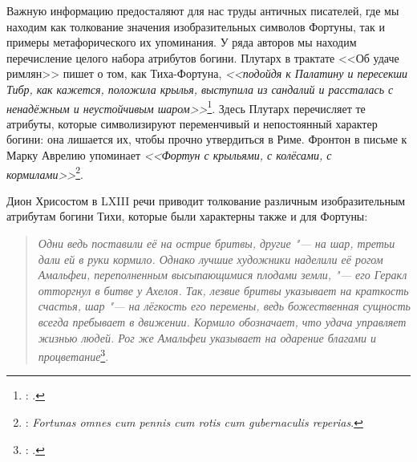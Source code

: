 


Важную информацию предосталяют для нас труды античных писателей, где мы находим как толкование значения изобразительных символов Фортуны, так и примеры метафорического их упоминания.
У ряда авторов мы находим перечисление целого набора атрибутов богини. Плутарх в трактате <<Об удаче римлян>> пишет о том, как Тиха-Фортуна, \textit{<<подойдя к Палатину и пересекши Тибр, как кажется, положила крылья, выступила из сандалий и рассталась с ненадёжным и неустойчивым шаром>>}\footnote{: .}. Здесь Плутарх перечисляет те атрибуты, которые символизируют переменчивый и непостоянный характер богини: она лишается их, чтобы прочно утвердиться в Риме. Фронтон в письме к Марку Аврелию упоминает \textit{<<Фортун с крыльями, с колёсами, с кормилами>>}\footnote{: \textit{Fortunas omnes cum pennis cum rotis cum gubernaculis reperias}.}.


Дион Хрисостом в LXIII речи приводит толкование различным изобразительным атрибутам богини Тихи, которые были характерны также и для Фортуны:

\begin{quote}
\textit{Одни ведь поставили её на острие бритвы, другие "--- на шар, третьи дали ей в руки кормило. Однако лучшие художники наделили её рогом Амальфеи, переполненным высыпающимися плодами земли, "--- его Геракл отторгнул в битве у Ахелоя. Так, лезвие бритвы указывает на краткость счастья, шар "--- на лёгкость его перемены, ведь божественная сущность всегда пребывает в движении. Кормило обозначает, что удача управляет жизнью людей. Рог же Амальфеи указывает на одарение благами и процветание}\footnote{: .}.
\end{quote}

